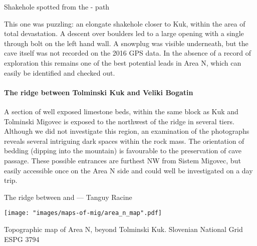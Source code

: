     \begin{marginfigure}
\centering
{} 
 \caption{Shakehole spotted from the  - \protect{} path}\label{shakehole next to kuk}
\end{marginfigure}

This one was puzzling: an elongate shakehole closer to Kuk, within the area of total devastation. A descent over boulders led to a large opening with a single through bolt on the left hand wall. A snowplug was visible underneath, but the cave itself was not recorded on the 2016 GPS data. In the absence of a record of exploration this remains one of the best potential leads in Area N, which can easily be identified and checked out.

\paragraph{The ridge between Tolminski Kuk and Veliki Bogatin}

A section of well exposed limestone beds, within the same block as Kuk and Tolminski Migovec is exposed to the northwest of the ridge in several tiers. Although we did not investigate this region, an examination of the photographs reveals several intriguing dark spaces within the rock mass. The orientation of bedding (dipping into the mountain) is favourable to the preservation of cave passage.  These possible entrances are furthest NW from Sistem Migovec, but easily accessible once on the Area N side and could well be investigated on a day trip.

\begin{pagefigure}
\checkoddpage \ifoddpage \forcerectofloat \else \forceversofloat \fi
    \caption{ The ridge between \protect{} and \protect{} --- Tanguy Racine }
\end{pagefigure}


 \begin{pagemap}
 \checkoddpage \ifoddpage \forcerectofloat \else \forceversofloat \fi
\centering
  \texttt{[image: "images/maps-of-mig/area\_n\_map".pdf]}
  
  \caption{Topographic map of Area N, beyond Tolminski Kuk. Slovenian National Grid ESPG 3794}
  \label{map:map area n}
 \end{pagemap}
